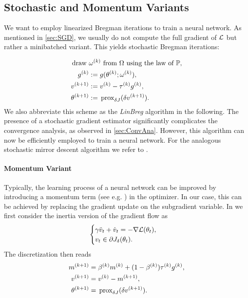 \subsection{Stochastic and Momentum Variants}\label{sec:Bregmom}
%
%
We want to employ linearized Bregman iterations to train a neural network. As mentioned in \cref{sec:SGD}, we usually do not compute the full gradient of $\mathcal{L}$ but rather a minibatched variant. This yields stochastic Bregman iterations:
%

\begin{align}\label{eq:stochlinbreg}
\begin{split}
\text{draw }&\omega^{(k)}\text{ from }\Omega\text{ using the law of }\mathbb{P},\\
g^{(k)} &:= {g(\theta^{(k)};\omega^{(k)})},\\
v^{(k+1)} &:= v^{(k)} - \tau^{(k)} g^{(k)},\\
\theta^{(k+1)} &:= \,\mathrm{prox}_{\delta J}(\delta v^{(k+1)}).
\end{split}
\end{align}
%
We also abbreviate this scheme as the \emph{LinBreg} algorithm in the following.
%
The presence of a stochastic gradient estimator significantly complicates the convergence analysis, as observed in \cref{sec:ConvAna}. However, this algorithm can now be efficiently employed to train a neural network. For the analogous stochastic mirror descent algorithm we refer to \cite{nemirovski2009robust}.
%
\paragraph{Momentum Variant} Typically, the learning process of a neural network can be improved by introducing a momentum term (see e.g. \cite{nesterov1983method, qian1999momentum}) in the optimizer. In our case, this can be achieved by replacing the gradient update on the subgradient variable. In \cite{bungert2022bregman} we first consider the inertia version of the gradient flow as
%
\begin{align*}
\begin{cases}
    \gamma \ddot{v}_t + \dot{v}_t = -\nabla\mathcal{L}(\theta_t), \\
    v_t \in \partial J_\delta(\theta_t).
\end{cases}
\end{align*}
%
The discretization then reads
%
\begin{align}\label{eq:momBreg}
\begin{split}
m^{(k+1)} &= \beta^{(k)} m^{(k)} + (1-\beta^{(k)})\tau^{(k)} g^{(k)},\\
v^{(k+1)} &= v^{(k)} - m^{(k+1)},\\
\theta^{(k+1)} &= \,\mathrm{prox}_{\delta J}(\delta v^{(k+1)}).
\end{split}
\end{align}
%
%
